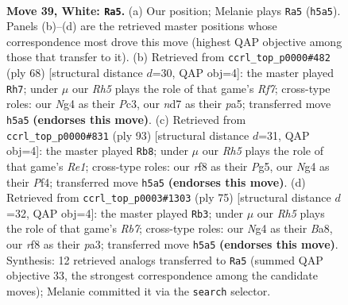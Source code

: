 \documentclass[11pt]{article}
\begin{document}
\clearpage

\begin{figure}[p]\centering
\begin{subfigure}{0.46\textwidth}\centering
\resizebox{\linewidth}{!}{%
\newchessgame
\chessboard[
  setfen={5rk1/1b1n4/8/7R/p2p2N1/P5P1/1PP5/2K5 w - - 0 39},
  showmover=false,
  pgfstyle=straightmove, color=movearrow, markmove={h5-a5}
]}
\caption{}
\end{subfigure}\hfill
\begin{subfigure}{0.46\textwidth}\centering
\resizebox{\linewidth}{!}{%
\newchessgame
\chessboard[
  setfen={2k1r3/5R2/2pp3p/p7/3P3P/2P3K1/1P6/8 w - - 0 35},
  showmover=false,
  pgfstyle=straightmove, color=movearrow, markmove={f7-h7}
]}
\caption{}
\end{subfigure}
\\[4pt]
\begin{subfigure}{0.46\textwidth}\centering
\resizebox{\linewidth}{!}{%
\newchessgame
\chessboard[
  setfen={4r3/8/6k1/p1pp2p1/5p2/PP6/3K2P1/1R3N2 b - - 3 47},
  showmover=false,
  pgfstyle=straightmove, color=movearrow, markmove={e8-b8}
]}
\caption{}
\end{subfigure}\hfill
\begin{subfigure}{0.46\textwidth}\centering
\resizebox{\linewidth}{!}{%
\newchessgame
\chessboard[
  setfen={b5k1/5pp1/8/p5P1/2P4P/P1N3K1/1r6/3R4 b - - 1 38},
  showmover=false,
  pgfstyle=straightmove, color=movearrow, markmove={b2-b3}
]}
\caption{}
\end{subfigure}
\caption{\textbf{Move 39, White: \texttt{Ra5}.} (a) Our position; Melanie plays \texttt{Ra5} (\texttt{h5a5}). Panels (b)--(d) are the retrieved master positions whose correspondence most drove this move (highest QAP objective among those that transfer to it). (b) Retrieved from \texttt{ccrl\_top\_p0000\#482} (ply 68) [structural distance $d$=30, QAP obj=4]: the master played \texttt{Rh7}; under $\mu$ our \emph{Rh5} plays the role of that game's \emph{Rf7}; cross-type roles: our \emph{N}g4 as their \emph{P}c3, our \emph{n}d7 as their \emph{p}a5; transferred move \texttt{h5a5} \textbf{(endorses this move)}. (c) Retrieved from \texttt{ccrl\_top\_p0000\#831} (ply 93) [structural distance $d$=31, QAP obj=4]: the master played \texttt{Rb8}; under $\mu$ our \emph{Rh5} plays the role of that game's \emph{Re1}; cross-type roles: our \emph{r}f8 as their \emph{P}g5, our \emph{N}g4 as their \emph{P}f4; transferred move \texttt{h5a5} \textbf{(endorses this move)}. (d) Retrieved from \texttt{ccrl\_top\_p0003\#1303} (ply 75) [structural distance $d$=32, QAP obj=4]: the master played \texttt{Rb3}; under $\mu$ our \emph{Rh5} plays the role of that game's \emph{Rb7}; cross-type roles: our \emph{N}g4 as their \emph{B}a8, our \emph{r}f8 as their \emph{p}a3; transferred move \texttt{h5a5} \textbf{(endorses this move)}. Synthesis: 12 retrieved analogs transferred to \texttt{Ra5} (summed QAP objective 33, the strongest correspondence among the candidate moves); Melanie committed it via the \texttt{search} selector.}
\label{fig:thought-m76}
\end{figure}
\end{document}
